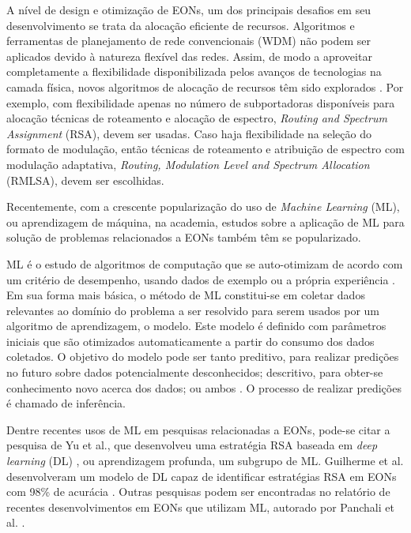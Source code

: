 A nível de design e otimização de EONs, um dos principais desafios em seu desenvolvimento se trata da alocação eficiente de recursos. Algoritmos e ferramentas de planejamento de rede convencionais (WDM) não podem ser aplicados devido à natureza flexível das redes. Assim, de modo a aproveitar completamente a flexibilidade disponibilizada pelos avanços de tecnologias na camada física, novos algoritmos de alocação de recursos têm sido explorados \cite{eon_tutorial_2014, eon_allocation_2011, eon_allocation_2011_2, eon_allocation_2016, eon_allocation_2017}. Por exemplo, com flexibilidade apenas no número de subportadoras disponíveis para alocação técnicas de roteamento e alocação de espectro, \textit{Routing and Spectrum Assignment} (RSA), devem ser usadas. Caso haja flexibilidade na seleção do formato de modulação, então técnicas de roteamento e atribuição de espectro com modulação adaptativa, \textit{Routing, Modulation Level and Spectrum Allocation} (RMLSA), devem ser escolhidas.

Recentemente, com a crescente popularização do uso de \textit{Machine Learning} (ML), ou aprendizagem de máquina, na academia, estudos sobre a aplicação de ML para solução de problemas relacionados a EONs também têm se popularizado.

ML é o estudo de algoritmos de computação que se auto-otimizam de acordo com um critério de desempenho, usando dados de exemplo ou a própria experiência \cite{mitchell1997ml, alpaydin2020introduction}. Em sua forma mais básica, o método de ML constitui-se em coletar dados relevantes ao domínio do problema a ser resolvido para serem usados por um algoritmo de aprendizagem, o modelo. Este modelo é definido com parâmetros iniciais que são otimizados automaticamente a partir do consumo dos dados coletados. O objetivo do modelo pode ser tanto preditivo, para realizar predições no futuro sobre dados potencialmente desconhecidos; descritivo, para obter-se conhecimento novo acerca dos dados; ou ambos \cite{alpaydin2020introduction, brief_introduction_to_ml}. O processo de realizar predições é chamado de inferência.

Dentre recentes usos de ML em pesquisas relacionadas a EONs, pode-se citar a pesquisa de Yu et al., que desenvolveu uma estratégia RSA baseada em \textit{deep learning} (DL) \cite{eon_ml_rsa_dl_2019}, ou aprendizagem profunda, um subgrupo de ML. Guilherme et al. desenvolveram um modelo de DL capaz de identificar estratégias RSA em EONs com 98\% de acurácia \cite{eon_ml_classifier_2020}. Outras pesquisas podem ser encontradas no relatório de recentes desenvolvimentos em EONs que utilizam ML, autorado por Panchali et al. \cite{eon_ml_recent_2019}.


